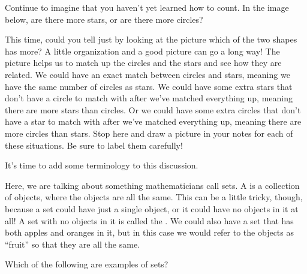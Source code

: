 \documentclass{ximera}
\begin{document}
\begin{question} \label{oneOneLine}
Continue to imagine that you haven't yet learned how to count. In the image below, are there more stars, or 
are there 
more circles?

\begin{center}
\end{center}

\begin{multipleChoice}
\end{multipleChoice}
\end{question}

This time, could you tell just by looking at the picture which of the two shapes has more? A little organization and a good picture can go a long way! The picture helps us to match up the circles and the stars and see how they are related. We could have an exact match between circles and stars, meaning we have the same number of circles as stars. We could have some extra stars that don't have a circle to match with after we've matched everything up, meaning there are more stars than circles. Or we could have some extra circles that don't have a star to match with after we've matched everything up, meaning there are more circles than stars. Stop here and draw a picture in your notes for each of these situations. Be sure to label them carefully!

It's time to add some terminology to this discussion.

Here, we are talking about something mathematicians call sets. A  is a collection of objects, where the objects are all the same. This can be a little tricky, though, because a set could have just a single object, or it could have no objects in it at all! A set with no objects in it is called the . We could also have a set that has both apples and oranges in it, but in this case we would refer to the objects as ``fruit'' so that they are all the same.

\begin{question}
Which of the following are examples of sets?
\begin{selectAll}
\end{selectAll}
\end{question}
\end{document}
